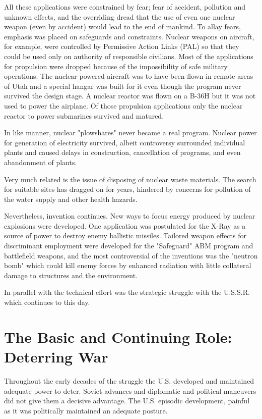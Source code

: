 All these applications were constrained by fear; fear of accident, pollution and unknown effects, and the overriding dread that the use of even one nuclear weapon (even by accident) would lead to the end of mankind. To allay fears, emphasis was placed on safeguards and constraints. Nuclear weapons on aircraft, for example, were controlled by Permissive Action Links (PAL) so that they could be used only on authority of responsible civilians. Most of the applications for propulsion were dropped because of the impossibility of safe military operations. The nuclear-powered aircraft was to have been flown in remote areas of Utah and a special hangar was built for it even though the program never survived the design stage. A nuclear reactor was flown on a B-36H but it was not used to power the airplane. Of those propulsion applications only the nuclear reactor to power submarines survived and matured.

In like manner, nuclear "plowshares" never became a real program. Nuclear power for generation of electricity survived, albeit controversy surrounded individual plants and caused delays in construction, cancellation of programs, and even abandonment of plants.

Very much related is the issue of disposing of nuclear waste materials. The search for suitable sites has dragged on for years, hindered by concerns for pollution of the water supply and other health hazards.

Nevertheless, invention continues. New ways to focus energy produced by nuclear explosions were developed. One application was postulated for the X-Ray as a source of power to destroy enemy ballistic missiles. Tailored weapon effects for discriminant employment were developed for the "Safeguard" ABM program and battlefield weapons, and the most controversial of the inventions was the "neutron bomb" which could kill enemy forces by enhanced radiation with little collateral damage to structures and the environment.

In parallel with the technical effort was the strategic struggle with the U.S.S.R. which continues to this day.

\section{The Basic and Continuing Role: Deterring War}
Throughout the early decades of the struggle the U.S. developed and maintained adequate power to deter. Soviet advances and diplomatic and political maneuvers did not give them a decisive advantage. The U.S. episodic development, painful as it was politically maintained an adequate posture.

